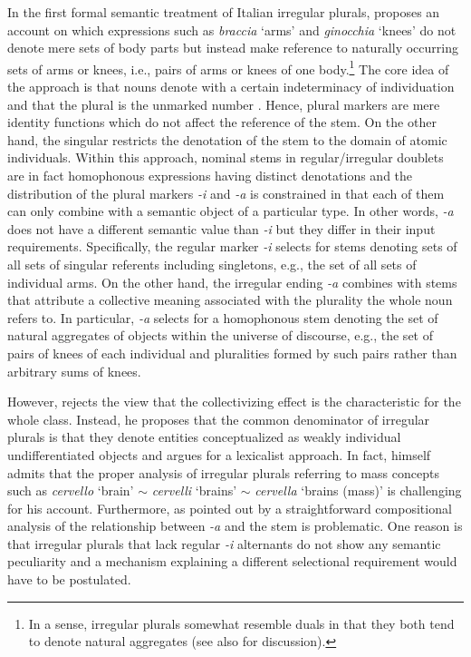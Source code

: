 In the first formal semantic treatment of Italian irregular plurals, \citet{ojeda1995semantics} proposes an account on which expressions such as \textit{braccia} `arms' and \textit{ginocchia} `knees' do not denote mere sets of body parts but instead make reference to naturally occurring sets of arms or knees, i.e., pairs of arms or knees of one body.\footnote{In a sense, irregular plurals somewhat resemble duals in that they both tend to denote natural aggregates (see also \citealt[p. 152]{acquaviva2008lexical} for discussion).} The core idea of the approach is that nouns denote with a certain indeterminacy of individuation and that the plural is the unmarked number \citep{ojeda1993linguistic}. Hence, plural markers are mere identity functions which do not affect the reference of the stem. On the other hand, the singular restricts the denotation of the stem to the domain of atomic individuals. Within this approach, nominal stems in regular/irregular doublets are in fact homophonous expressions having distinct denotations and the distribution of the plural markers \textit{-i} and \textit{-a} is constrained in that each of them can only combine with a semantic object of a particular type. In other words, \textit{-a} does not have a different semantic value than \textit{-i} but they differ in their input requirements. Specifically, the regular marker \textit{-i} selects for stems denoting sets of all sets of singular referents including singletons, e.g., the set of all sets of individual arms. On the other hand, the irregular ending \textit{-a} combines with stems that attribute a collective meaning associated with the plurality the whole noun refers to. In particular, \textit{-a} selects for a homophonous stem denoting the set of natural aggregates of objects within the universe of discourse, e.g., the set of pairs of knees of each individual and pluralities formed by such pairs rather than arbitrary sums of knees.

However, \citet{acquaviva2008lexical} rejects the view that the collectivizing effect is the characteristic for the whole class. Instead, he proposes that the common denominator of irregular plurals is that they denote entities conceptualized as weakly individual undifferentiated objects and argues for a lexicalist approach. In fact, \citet{ojeda1995semantics} himself admits that the proper analysis of irregular plurals referring to mass concepts such as \textit{cervello} `brain' $\sim$ \textit{cervelli} `brains' $\sim$ \textit{cervella} `brains (mass)' is challenging for his account. Furthermore, as pointed out by \citeauthor{acquaviva2008lexical} a straightforward compositional analysis of the relationship between \textit{-a} and the stem is problematic. One reason is that irregular plurals that lack regular \textit{-i} alternants do not show any semantic peculiarity and a mechanism explaining a different selectional requirement would have to be postulated.\largerpage

